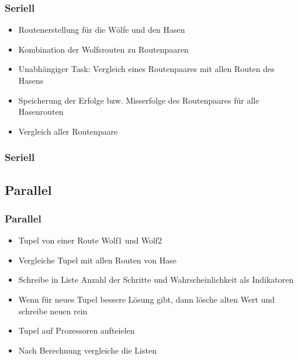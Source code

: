 \documentclass{beamer}
\begin{document}
\begin{frame}
\frametitle{Seriell}
\begin{itemize}
\item Routenerstellung f\"ur die W\"olfe und den Hasen
\item Kombination der Wolfsrouten zu Routenpaaren
\item Unabh\"angiger Task: Vergleich eines Routenpaares mit allen Routen des Hasens
\item Speicherung der Erfolge bzw. Misserfolge des Routenpaares f\"ur alle Hasenrouten
\item Vergleich aller Routenpaare
\end{itemize}
\end{frame}



\begin{frame}
\begin{algorithm}[H]
\frametitle{Seriell}
 {
 }
\end{algorithm}
\end{frame}

\subsection{Parallel}
\begin{frame}
\frametitle{Parallel}
\begin{itemize}
\item Tupel von einer Route Wolf1 und Wolf2
\item Vergleiche Tupel mit allen Routen von Hase
\item Schreibe in Liste Anzahl der Schritte und Wahrscheinlichkeit als Indikatoren
\item Wenn f\"ur neues Tupel bessere L\"osung gibt, dann l\"osche alten Wert und schreibe neuen rein

\item Tupel auf Prozessoren aufteielen
\item Nach Berechnung vergleiche die Listen
\end{itemize}
\end{frame}
\end{document}
